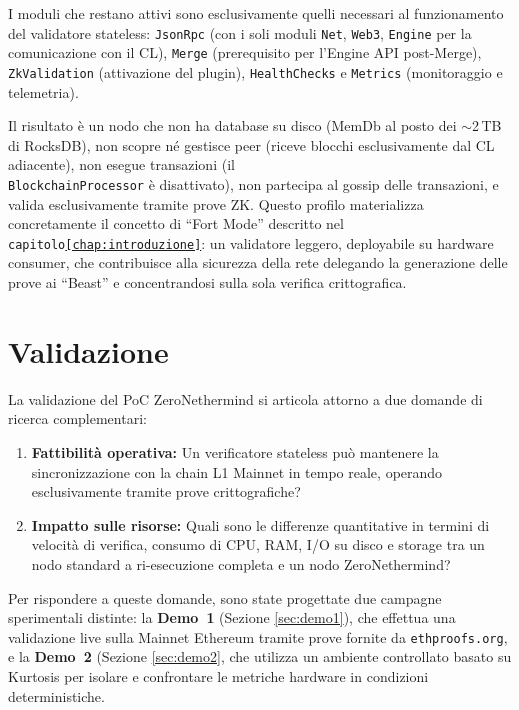 \documentclass[12pt,a4paper,openright,twoside]{report}
\begin{document}
I moduli che restano attivi sono esclusivamente quelli necessari al funzionamento del validatore stateless: \texttt{JsonRpc} (con i soli moduli \texttt{Net}, \texttt{Web3}, \texttt{Engine} per la comunicazione con il CL), \texttt{Merge} (prerequisito per l'Engine API post-Merge), \texttt{ZkValidation} (attivazione del plugin), \texttt{HealthChecks} e \texttt{Metrics} (monitoraggio e telemetria).

Il risultato è un nodo che non ha database su disco (MemDb al posto dei $\sim$2\,TB di RocksDB), non scopre né gestisce peer (riceve blocchi esclusivamente dal CL adiacente), non esegue transazioni (il \\ \texttt{BlockchainProcessor} è disattivato), non partecipa al gossip delle transazioni, e valida esclusivamente tramite prove ZK. Questo profilo materializza concretamente il concetto di ``Fort Mode'' descritto nel \texttt{capitolo\ref{chap:introduzione}}: un validatore leggero, deployabile su hardware consumer, che contribuisce alla sicurezza della rete delegando la generazione delle prove ai ``Beast'' e concentrandosi sulla sola verifica crittografica.



\chapter{Validazione}\label{chap:validazione}

La validazione del PoC ZeroNethermind si articola attorno a due domande di ricerca complementari:

\begin{enumerate}
    \item \textbf{Fattibilità operativa:} Un verificatore stateless può mantenere la sincronizzazione con la chain L1 Mainnet in tempo reale, operando esclusivamente tramite prove crittografiche?
    \item \textbf{Impatto sulle risorse:} Quali sono le differenze quantitative in termini di velocità di verifica, consumo di CPU, RAM, I/O su disco e storage tra un nodo standard a ri-esecuzione completa e un nodo ZeroNethermind?
\end{enumerate}

Per rispondere a queste domande, sono state progettate due campagne sperimentali distinte: la \textbf{Demo~1} (Sezione \ref{sec:demo1}), che effettua una validazione live sulla Mainnet Ethereum tramite prove fornite da \texttt{ethproofs.org}, e la \textbf{Demo~2} (Sezione \ref{sec:demo2}, che utilizza un ambiente controllato basato su Kurtosis\cite{kurtosis} per isolare e confrontare le metriche hardware in condizioni deterministiche.
\end{document}
